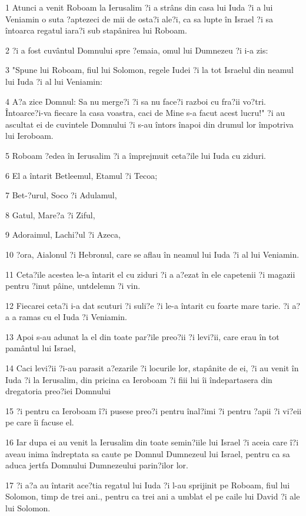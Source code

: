 \par 1 Atunci a venit Roboam la Ierusalim ?i a strâns din casa lui Iuda ?i a lui Veniamin o suta ?aptezeci de mii de osta?i ale?i, ca sa lupte în Israel ?i sa întoarca regatul iara?i sub stapânirea lui Roboam.
\par 2 ?i a fost cuvântul Domnului spre ?emaia, omul lui Dumnezeu ?i i-a zis:
\par 3 "Spune lui Roboam, fiul lui Solomon, regele Iudei ?i la tot Israelul din neamul lui Iuda ?i al lui Veniamin:
\par 4 A?a zice Domnul: Sa nu merge?i ?i sa nu face?i razboi cu fra?ii vo?tri. Întoarce?i-va fiecare la casa voastra, caci de Mine s-a facut acest lucru!" ?i au ascultat ei de cuvintele Domnului ?i s-au întors înapoi din drumul lor împotriva lui Ieroboam.
\par 5 Roboam ?edea în Ierusalim ?i a împrejmuit ceta?ile lui Iuda cu ziduri.
\par 6 El a întarit Betleemul, Etamul ?i Tecoa;
\par 7 Bet-?urul, Soco ?i Adulamul,
\par 8 Gatul, Mare?a ?i Ziful,
\par 9 Adoraimul, Lachi?ul ?i Azeca,
\par 10 ?ora, Aialonul ?i Hebronul, care se aflau în neamul lui Iuda ?i al lui Veniamin.
\par 11 Ceta?ile acestea le-a întarit el cu ziduri ?i a a?ezat în ele capetenii ?i magazii pentru ?inut pâine, untdelemn ?i vin.
\par 12 Fiecarei ceta?i i-a dat scuturi ?i suli?e ?i le-a întarit cu foarte mare tarie. ?i a?a a ramas cu el Iuda ?i Veniamin.
\par 13 Apoi s-au adunat la el din toate par?ile preo?ii ?i levi?ii, care erau în tot pamântul lui Israel,
\par 14 Caci levi?ii ?i-au parasit a?ezarile ?i locurile lor, stapânite de ei, ?i au venit în Iuda ?i la Ierusalim, din pricina ca Ieroboam ?i fiii lui îi îndepartasera din dregatoria preo?iei Domnului
\par 15 ?i pentru ca Ieroboam î?i pusese preo?i pentru înal?imi ?i pentru ?apii ?i vi?eii pe care îi facuse el.
\par 16 Iar dupa ei au venit la Ierusalim din toate semin?iile lui Israel ?i aceia care î?i aveau inima îndreptata sa caute pe Domnul Dumnezeul lui Israel, pentru ca sa aduca jertfa Domnului Dumnezeului parin?ilor lor.
\par 17 ?i a?a au întarit ace?tia regatul lui Iuda ?i l-au sprijinit pe Roboam, fiul lui Solomon, timp de trei ani., pentru ca trei ani a umblat el pe caile lui David ?i ale lui Solomon.
